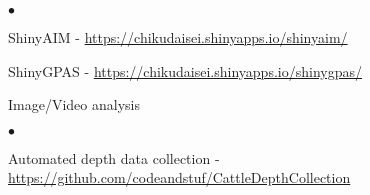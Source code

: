\documentclass[margin,line,10pt]{res}
\newenvironment{list1}{
  \begin{list}{\ding{113}}{%
      \setlength{\itemsep}{0in}
      \setlength{\parsep}{0in} \setlength{\parskip}{0in}
      \setlength{\topsep}{0in} \setlength{\partopsep}{0in} 
      \setlength{\leftmargin}{0.17in}}}{\end{list}}
\newenvironment{list2}{
  \begin{list}{$\bullet$}{%
      \setlength{\itemsep}{0in}
      \setlength{\parsep}{0in} \setlength{\parskip}{0in}
      \setlength{\topsep}{0in} \setlength{\partopsep}{0in} 
      \setlength{\leftmargin}{0.2in}}}{\end{list}}
\begin{document}
\begin{resume}
\begin{list1}
\begin{list2}
    \item ShinyAIM - \textcolor{blue}{\href{https://chikudaisei.shinyapps.io/shinyaim/}{https://chikudaisei.shinyapps.io/shinyaim/}}

    \vspace{0.3cm}
    
\item ShinyGPAS - \textcolor{blue}{\href{https://chikudaisei.shinyapps.io/shinygpas/}{https://chikudaisei.shinyapps.io/shinygpas/}} 
\end{list2}



\vspace{0.3cm}
\item[] Image/Video analysis
  \begin{list2}
  \item Automated depth data collection - \textcolor{blue}{\href{https://github.com/codeandstuf/CattleDepthCollection}{https://github.com/codeandstuf/CattleDepthCollection}}
\end{list2}



\end{list1}
\end{resume}
\end{document}
